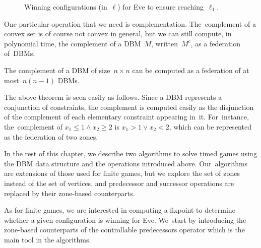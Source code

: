 \begin{figure}[ht]
\begin{tikzpicture}[node distance=2.5cm,auto]
  \end{tikzpicture}
  \caption{Winning configurations (in~$\ell$)
    for Eve to ensure reaching~$\ell_1$.
  }
  \label{9-fig:non-convex}
\end{figure}

One particular operation that we need is complementation.
The~complement of a convex set is of course not convex in general, but
we can still compute, in polynomial time, the complement of a DBM~$M$,
written~$M^c$, as a federation of~DBMs.
\begin{theorem}
\label{9-thm:complement_DBM}
  The complement of a DBM of size~$n\times n$ can be computed as a
  federation of at most~$n(n-1)$ DBMs.
\end{theorem}
The above theorem is seen easily as follows. Since a DBM represents a
conjunction of constraints, the complement is computed easily as the
disjunction of the complement of each elementary constraint appearing
in~it.  For~instance, the~complement of $x_1\leq 1 \land x_2 \geq 2$ is
$x_1>1 \lor x_2<2$, which can be represented as the federation of two
zones.




In the rest of this chapter, we describe two algorithms to solve timed
games using the DBM data structure and the operations introduced
above. Our~algorithms are extensions of those used for finite games,
but we explore the set of zones instead of the set of vertices, and
predecessor and successor operations are replaced by their zone-based
counterparts.

As for finite games, we are interested in computing a fixpoint to
determine whether a given configuration is winning for Eve. We~start
by introducing the zone-based counterparts of the controllable predecessors operator
which
is the main tool in the algorithms.
